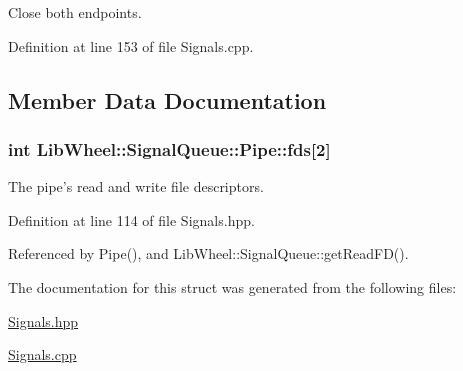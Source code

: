 \-Close both endpoints. 

\-Definition at line 153 of file \-Signals.\-cpp.



\subsection{\-Member \-Data \-Documentation}
\hypertarget{structLibWheel_1_1SignalQueue_1_1Pipe_ad2acca11d1308cf147253e6def4935dc}{
\subsubsection[{fds}]{\setlength{\rightskip}{0pt plus 5cm}int {\bf \-Lib\-Wheel\-::\-Signal\-Queue\-::\-Pipe\-::fds}\mbox{[}2\mbox{]}}}
\label{structLibWheel_1_1SignalQueue_1_1Pipe_ad2acca11d1308cf147253e6def4935dc}


\-The pipe's read and write file descriptors. 



\-Definition at line 114 of file \-Signals.\-hpp.



\-Referenced by \-Pipe(), and \-Lib\-Wheel\-::\-Signal\-Queue\-::get\-Read\-F\-D().



\-The documentation for this struct was generated from the following files\-:\begin{DoxyCompactItemize}
\item 
\hyperlink{Signals_8hpp}{\-Signals.\-hpp}\item 
\hyperlink{Signals_8cpp}{\-Signals.\-cpp}\end{DoxyCompactItemize}
